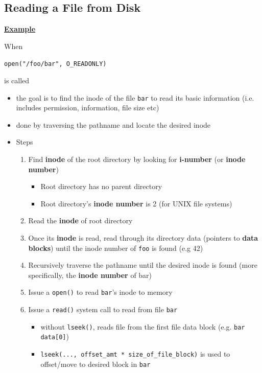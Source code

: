 \documentclass[12pt]{article}
\begin{document}
\subsection{Reading a File from Disk}

\underline{\textbf{Example}}

\bigskip

When

\bigskip

\texttt{open("/foo/bar", O\_READONLY)}

\bigskip

is called

\bigskip

\begin{itemize}
    \item the goal is to find the inode of the file \texttt{bar} to read its basic information
    (i.e. includes permission, information, file size etc)
    \item done by traversing the pathname and locate the desired inode
    \item Steps

    \begin{enumerate}[1.]
        \item Find \textbf{inode} of the root directory by looking for \textbf{i-number} (or
        \textbf{inode number})
        \begin{itemize}
            \item Root directory has no parent directory
            \item Root directory's \textbf{inode number} is 2 (for UNIX file systems)
        \end{itemize}

        \item Read the \textbf{inode} of root directory
        \item Once its \textbf{inode} is read, read through its directory data (pointers to \textbf{data blocks})
        until the inode number of \texttt{foo} is found (e.g 42)
        \item Recursively traverse the pathname until the desired inode is found (more specifically, the \textbf{inode number} of bar)
        \item Issue a \texttt{open()} to read \texttt{bar}'s inode to memory
        \item Issue a \texttt{read()} system call to read from file \texttt{bar}

        \begin{itemize}
            \item without \texttt{lseek()}, reads file from the first file data block (e.g. \texttt{bar data[0]})
            \item \texttt{lseek(..., offset\_amt * size\_of\_file\_block)} is used to offset/move to desired block in \texttt{bar}
        \end{itemize}


\end{enumerate}
\end{itemize}
\end{document}
